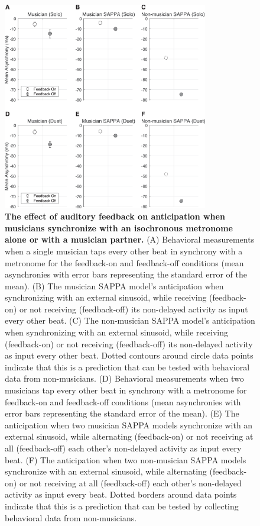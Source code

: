 \documentclass{report}
\begin{document}
\begin{figure}
    \centering
    \includegraphics[width=0.8\textwidth]{figures/fig2_3.png}
    \caption[The effect of auditory feedback on anticipation when musicians synchronize with an isochronous metronome alone or with a musician partner]{\textbf{The effect of auditory feedback on anticipation when musicians synchronize with an isochronous metronome alone or with a musician partner.} (A) Behavioral measurements when a single musician taps every other beat in synchrony with a metronome for the feedback-on and feedback-off conditions (mean asynchronies with error bars representing the standard error of the mean). (B) The musician SAPPA model's anticipation when synchronizing with an external sinusoid, while receiving (feedback-on) or not receiving (feedback-off) its non-delayed activity as input every other beat. (C) The non-musician SAPPA model's anticipation when synchronizing with an external sinusoid, while receiving (feedback-on) or not receiving (feedback-off) its non-delayed activity as input every other beat. Dotted contours around circle data points indicate that this is a prediction that can be tested with behavioral data from non-musicians. (D) Behavioral measurements when two musicians tap every other beat in synchrony with a metronome for feedback-on and feedback-off conditions (mean asynchronies with error bars representing the standard error of the mean). (E) The anticipation when two musician SAPPA models synchronize with an external sinusoid, while alternating (feedback-on) or not receiving at all (feedback-off) each other's non-delayed activity as input every beat. (F) The anticipation when two non-musician SAPPA models synchronize with an external sinusoid, while alternating (feedback-on) or not receiving at all (feedback-off) each other's non-delayed activity as input every beat. Dotted borders around data points indicate that this is a prediction that can be tested by collecting behavioral data from non-musicians.}
    \label{f2_3}
\end{figure}
\end{document}

